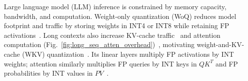 \documentclass[sigconf,anonymous,nonacm]{acmart}
\newcommand{\wkv}{WKV}
\begin{document}

Large language model (LLM) inference is constrained by memory capacity, bandwidth, and computation. Weight-only quantization (WoQ) reduces model footprint and traffic by storing weights in INT4 or INT8 while retaining FP activations~\cite{frantar2022gptq,lin2023awq,dettmers2023spqr,shao2023omniquant,liu2024spinquant}. Long contexts also increase KV-cache traffic~\cite{pagedattention} and attention computation (Fig.~\ref{fig:long_seq_atten_overhead})~\cite{attentionisallyouneed,flashattention,flashattention2}, motivating weight-and-KV-cache (\wkv{}) quantization~\cite{yue2024wkvquant,liu2024spinquant}. Its linear layers multiply FP activations by INT weights; attention similarly multiplies FP queries by INT keys in $QK^T$ and FP probabilities by INT values in $PV$~\cite{figna,yue2024wkvquant,liu2024spinquant}.
\end{document}
